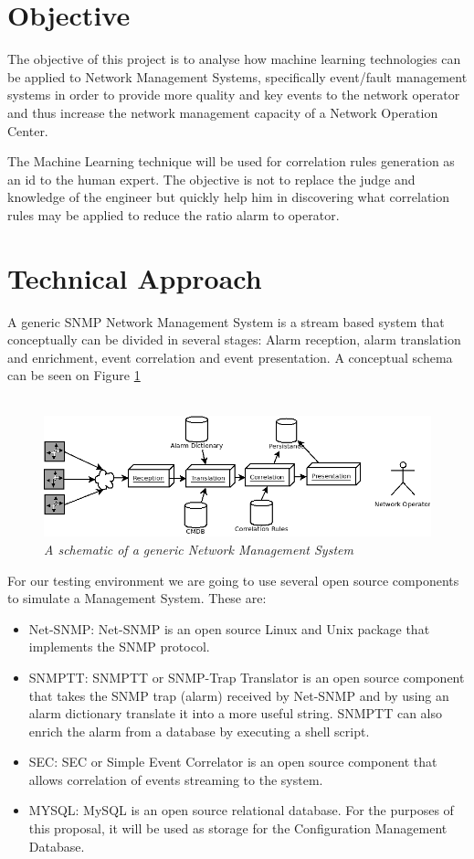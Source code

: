 \documentclass[10pt,a4paper]{article}
\begin{document}
 \section{Objective}
The objective of this project is to analyse how machine learning technologies can be applied to Network Management Systems, specifically event/fault management systems in order to provide more quality and key events to the network operator and thus increase the network management capacity of a Network Operation Center.

The Machine Learning technique will be used for correlation rules generation as an id to the human expert. The objective is not to replace the judge and knowledge of the engineer but quickly help him in discovering what correlation rules may be applied to reduce the ratio alarm to operator.
 
  \section{Technical Approach}
A generic SNMP Network Management System is a stream based system that conceptually can be divided in several stages: Alarm reception, alarm translation and enrichment, event correlation and event presentation. A conceptual schema can be seen on Figure \ref{fig:nms_generaldiagram}
\\\
\begin{figure}[H]
 \includegraphics[scale=0.5]{NMS_GeneralDiagram.png}
  \centering
  \caption{\textit{A schematic of a generic Network Management System}}
  \label{fig:nms_generaldiagram}
\end{figure}	

For our testing environment we are going to use several open source components to simulate a Management System. These are:

\begin{itemize}
  \item Net-SNMP: Net-SNMP is an open source Linux and Unix package that implements the SNMP protocol.\cite{netsnmp}
  \item SNMPTT: SNMPTT or SNMP-Trap Translator is an open source component that takes the SNMP trap (alarm) received by Net-SNMP and by using an alarm dictionary translate it into a more useful string. SNMPTT can also enrich the alarm from a database by executing a shell script.\cite{snmptt}
  \item SEC: SEC or Simple Event Correlator is an open source component that allows correlation of events streaming to the system.\cite{sec}
  \item MYSQL: MySQL is an open source relational database. For the purposes of this proposal, it will be used as storage for the Configuration Management Database.
\end{itemize}
\end{document}
